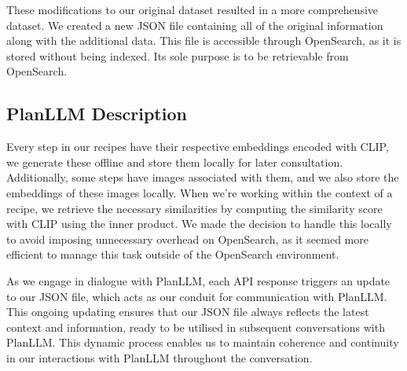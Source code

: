 \documentclass[runningheads]{llncs}
\begin{document}
These modifications to our original dataset resulted in a more comprehensive dataset. We created a new JSON file containing all of the original information along with the additional data. This file is accessible through OpenSearch, as it is stored without being indexed. Its sole purpose is to be retrievable from OpenSearch.

\subsection{PlanLLM Description}
Every step in our recipes have their respective embeddings encoded with CLIP, we generate these offline and store them locally for later consultation. Additionally, some steps have images associated with them, and we also store the embeddings of these images locally. When we're working within the context of a recipe, we retrieve the necessary similarities by computing the similarity score with CLIP using the inner product. We made the decision to handle this locally to avoid imposing unnecessary overhead on OpenSearch, as it seemed more efficient to manage this task outside of the OpenSearch environment.

As we engage in dialogue with PlanLLM, each API response triggers an update to our JSON file, which acts as our conduit for communication with PlanLLM. This ongoing updating ensures that our JSON file always reflects the latest context and information, ready to be utilised in subsequent conversations with PlanLLM. This dynamic process enables us to maintain coherence and continuity in our interactions with PlanLLM throughout the conversation.


\end{document}
